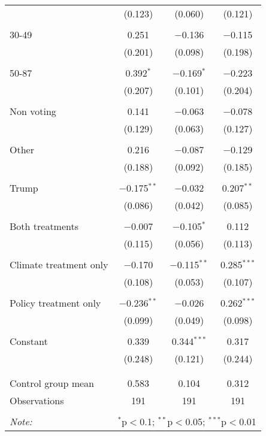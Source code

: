 \begin{tabular}{@{\extracolsep{5pt}}lccc}
  & (0.123) & (0.060) & (0.121) \\ 
  & & & \\ 
 30-49 & 0.251 & $-$0.136 & $-$0.115 \\ 
  & (0.201) & (0.098) & (0.198) \\ 
  & & & \\ 
 50-87 & 0.392$^{*}$ & $-$0.169$^{*}$ & $-$0.223 \\ 
  & (0.207) & (0.101) & (0.204) \\ 
  & & & \\ 
 Non voting & 0.141 & $-$0.063 & $-$0.078 \\ 
  & (0.129) & (0.063) & (0.127) \\ 
  & & & \\ 
 Other & 0.216 & $-$0.087 & $-$0.129 \\ 
  & (0.188) & (0.092) & (0.185) \\ 
  & & & \\ 
 Trump & $-$0.175$^{**}$ & $-$0.032 & 0.207$^{**}$ \\ 
  & (0.086) & (0.042) & (0.085) \\ 
  & & & \\ 
 Both treatments & $-$0.007 & $-$0.105$^{*}$ & 0.112 \\ 
  & (0.115) & (0.056) & (0.113) \\ 
  & & & \\ 
 Climate treatment only & $-$0.170 & $-$0.115$^{**}$ & 0.285$^{***}$ \\ 
  & (0.108) & (0.053) & (0.107) \\ 
  & & & \\ 
 Policy treatment only & $-$0.236$^{**}$ & $-$0.026 & 0.262$^{***}$ \\ 
  & (0.099) & (0.049) & (0.098) \\ 
  & & & \\ 
 Constant & 0.339 & 0.344$^{***}$ & 0.317 \\ 
  & (0.248) & (0.121) & (0.244) \\ 
  & & & \\ 
\hline \\[-1.8ex] 
Control group mean & 0.583 & 0.104 & 0.312 \\ 
Observations & 191 & 191 & 191 \\ 
\hline 
\hline \\[-1.8ex] 
\textit{Note:}  & \multicolumn{3}{r}{$^{*}$p$<$0.1; $^{**}$p$<$0.05; $^{***}$p$<$0.01} \\ 
\end{tabular} 

